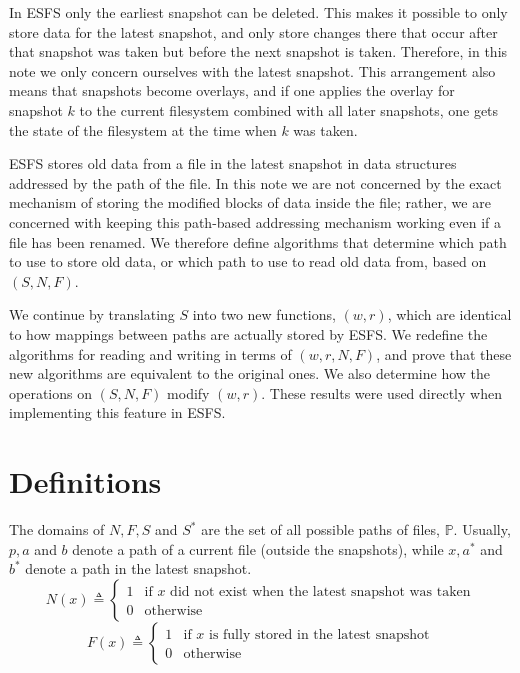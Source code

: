 \documentclass[12pt]{article}
\newcommand{\setp}{\mathbb{P}}
\begin{document}
In ESFS only the earliest snapshot can be deleted.
This makes it possible to only store data for the latest snapshot, and only store changes there that
occur after that snapshot was taken but before the next snapshot is taken.
Therefore, in this note we only concern ourselves with the latest snapshot.
This arrangement also means that snapshots become overlays,
and if one applies the overlay for snapshot $k$ to the current
filesystem combined with all later snapshots, one gets the state of the filesystem at the time when
$k$ was taken.

ESFS stores old data from a file in the latest snapshot in data structures addressed by the path of the file.
In this note we are not concerned by the exact mechanism of storing the modified blocks
of data inside the file; rather, we are concerned with keeping this path-based addressing
mechanism working even if a file has been renamed.
We therefore define algorithms that determine which path to use to store old data,
or which path to use to read old data from, based on $(S, N, F)$.

We continue by translating $S$ into two new functions, $(w, r)$, which are identical
to how mappings between paths are actually stored by ESFS.
We redefine the algorithms for reading and writing in terms of $(w, r, N, F)$,
and prove that these new algorithms are equivalent to the original ones.
We also determine how the operations on $(S, N, F)$ modify $(w, r)$.
These results were used directly when implementing this feature in ESFS.

\section{Definitions}

The domains of $N, F, S$ and $S^*$ are the set of all possible paths of files, $\setp$.
Usually, $p, a$ and $b$ denote a path of a current file (outside the snapshots), while $x, a^*$ and $b^*$
denote a path in the latest snapshot.
$$
N(x)\triangleq\left\{ \begin{array}{ll}
1 & \mbox{if $x$ did not exist when the latest snapshot was taken} \\
0 & \mbox{otherwise}
\end{array}\right.
$$
$$
F(x)\triangleq\left\{ \begin{array}{ll}
1 & \mbox{if $x$ is fully stored in the latest snapshot} \\
0 & \mbox{otherwise}
\end{array}\right.
$$
\end{document}
